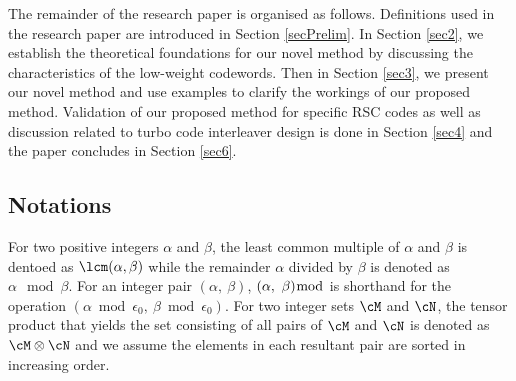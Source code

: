 The remainder of the research paper is organised as follows. Definitions used in the research paper are introduced in Section \ref{secPrelim}. In Section \ref{sec2}, we establish the theoretical foundations for our novel method by discussing the characteristics of the low-weight codewords. Then in Section \ref{sec3}, we present our novel method and use examples to clarify the workings of our proposed method. Validation of our proposed method for specific RSC codes as well as discussion related to turbo code interleaver design is done in Section \ref{sec4} and the paper concludes in Section \ref{sec6}.

\subsection{Notations}

For two positive integers $\alpha$ and $\beta$, the least common multiple of $\alpha$ and $\beta$ is dentoed as $\lcm(\alpha,\beta)$ while the remainder $\alpha$ divided by $\beta$ is denoted as $\alpha \mod \beta$. For an integer pair $(\alpha,~\beta)$, $(\alpha,~\beta) \bmod $ is shorthand for the operation $(\alpha \bmod \epsilon_0,~\beta \bmod \epsilon_0)$. For two integer sets $\cM$ and $\cN$, the tensor product that yields the set consisting of all pairs of $\cM$ and $\cN$ is denoted as $\cM \otimes \cN$ and we assume the elements in each resultant pair are sorted in increasing order. 


